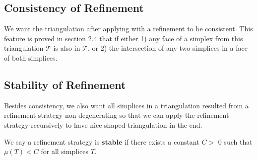     \subsection{Consistency of Refinement}
    We want the triangulation after applying with a refinement to be consistent. This feature is proved in section 2.4 that if either 1) any face of a simplex from this triangulation $\mathcal{T}$ is also in $\mathcal{T}$, or 2) the intersection of any two simplices in a face of both simplices.

    \subsection{Stability of Refinement}
    Besides consistency, we also want all simplices in a triangulation resulted from a refinement strategy non-degenerating so that we can apply the refinement strategy recursively to have nice shaped triangulation in the end.
    
    \begin{definition*}
    We say a refinement strategy is $\textbf{stable}$ if there exists a constant $C >$ 0 such that $\mu(T)< C$ for all simplices $T$.
    \end{definition*}
    
